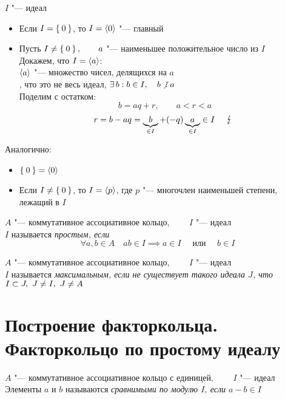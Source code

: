 \begin{eproof}
	\item $ I $ "--- идеал
	\begin{itemize}
		\item Если $ I = \Set{0} $, то $ I = \Braket{0} $ "--- главный
		\item Пусть $ I \ne \Set{0}, \qquad a $ "--- наименьшее положительное число из $ I $ \\
		Докажем, что $ I = \Braket{a} $: \\
		$ \Braket{a} $ "--- множество чисел, делящихся на $ a $ \\
		, что это не весь идеал, \ie $ \exist b : b \in I, \quad b \ndivby a $ \\
		Поделим с остатком:
		$$ b = aq + r, \qquad a < r < a $$
		$$ r = b - aq = \underbrace{b}_{\in I} + (-q)\underbrace{a}_{\in I} \in I \quad \contra $$
	\end{itemize}

	\item Аналогично:
	\begin{itemize}
		\item $ \Set{0} = \Braket{0} $
		\item Если $ I \ne \Set{0} $, то $ I = \Braket{p} $, где $ p $ "--- многочлен наименьшей степени, лежащий в $ I $
	\end{itemize}
\end{eproof}

\begin{definition}
	$ A $ "--- коммутативное ассоциативное кольцо, $ \qquad I $ "--- идеал \\
	$ I $ называется \it{простым}, если
	$$ \forall a, b \in A \quad ab \in I \implies a \in I \quad \text{ или } \quad b \in I $$
\end{definition}

\begin{definition}
	$ A $ "--- коммутативное ассоциативное кольцо, $ \qquad I $ "--- идеал \\
	$ I $ называется \it{максимальным}, если не существует такого идеала $ J $, что $ I \subset J, ~ J \ne I, ~ J \ne A $
\end{definition}

\section{Построение факторкольца. Факторкольцо по простому идеалу}

\begin{definition}
	$ A $ "--- коммутативное ассоциативное кольцо с единицей, $ \qquad I $ "--- идеал \\
	Элементы $ a $ и $ b $ называются \it{сравнимыми по модулю} $ I $, если $ a - b \in I $
\end{definition}

